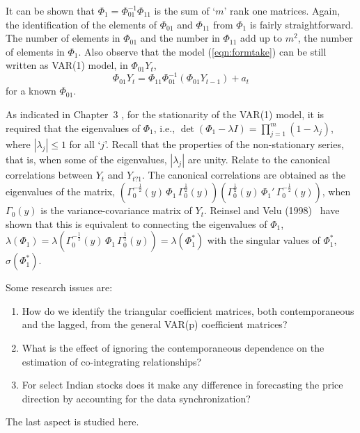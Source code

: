 It can be shown that $\Phi_1= \Phi_{01}^{-1} \Phi_{11}$ is the sum of `$m$' rank one matrices. Again, the identification of the elements of $\Phi_{01}$ and $\Phi_{11}$ from $\Phi_1$ is fairly straightforward. The number of elements in $\Phi_{01}$ and the number in $\Phi_{11}$ add up to $m^2$, the number of elements in $\Phi_1$. Also observe that the model (\ref{eqn:formtake}) can be still written as VAR(1) model, in $\Phi_{01} Y_t$,
	\begin{equation}\label{eqn:var1phimod}
	\Phi_{01} Y_t = \Phi_{11} \Phi_{01}^{-1} ( \Phi_{01} Y_{t-1}) + a_t
	\end{equation}
for a known $\Phi_{01}$.


As indicated in Chapter~3 , for the stationarity of the VAR(1) model, it is required that the eigenvalues of $\Phi_1$, i.e., $\det(\Phi_1 - \lambda I)= \prod_{j=1}^m (1-\lambda_j)$, where $|\lambda_j| \leq 1$ for all `$j$'. Recall that the properties of the non-stationary series, that is, when some of the eigenvalues, $|\lambda_j|$ are unity. Relate to the canonical correlations between $Y_t$ and $Y_{t?1}$. The canonical correlations are obtained as the eigenvalues of the matrix, $(\Gamma_0^{- \frac{1}{2}} (y)\, \Phi_1 \,\Gamma_0^{\frac{1}{2}}(y)) ( \Gamma_0^{\frac{1}{2}}(y) \,\Phi_1'\,  \Gamma_0^{-\frac{1}{2}}(y))$, when $\Gamma_0(y)$ is the variance-covariance matrix of $Y_t$. Reinsel and Velu (1998)~\cite{velurein} have shown that this is equivalent  to connecting the eigenvalues of $\Phi_1$, $\lambda(\Phi_1)= \lambda( \Gamma_0^{-\frac{1}{2}} (y) \,\Phi_1\, \Gamma_0^{\frac{1}{2}}(y))= \lambda(\Phi_1^*)$ with the singular values of $\Phi_1^*$, $\sigma(\Phi_1^*)$. 


Some research issues are: 

\begin{enumerate}[--]
\item How do we identify the triangular coefficient matrices, both contemporaneous and the lagged, from the general VAR(p) coefficient matrices?
\item What is the effect of ignoring the contemporaneous dependence on the estimation of co-integrating relationships?
\item For select Indian stocks does it make any difference in forecasting the price direction by accounting for the data synchronization?
\end{enumerate}
The last aspect is studied here. 


